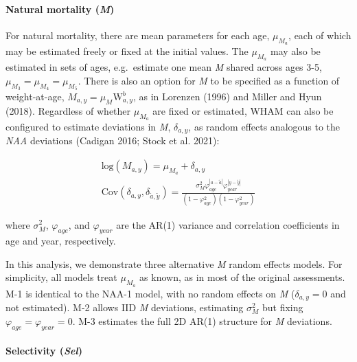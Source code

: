 \documentclass[]{article}
\let\oldparagraph\paragraph
\renewcommand{\paragraph}[1]{\oldparagraph{#1}\mbox{}}
\begin{document}
\hypertarget{natural-mortality-m}{%
\paragraph{\texorpdfstring{Natural mortality
(\emph{M})}{Natural mortality (M)}}\label{natural-mortality-m}}

For natural mortality, there are mean parameters for each age,
\(\mu_{M_a}\), each of which may be estimated freely or fixed at the
initial values. The \(\mu_{M_a}\) may also be estimated in sets of ages,
e.g.~estimate one mean \emph{M} shared across ages 3-5,
\(\mu_{M_3} = \mu_{M_4} = \mu_{M_5}\). There is also an option for
\emph{M} to be specified as a function of weight-at-age,
\(M_{a,y} = \mu_M \text{W}^b_{a,y}\), as in Lorenzen (1996) and Miller
and Hyun (2018). Regardless of whether \(\mu_{M_a}\) are fixed or
estimated, WHAM can also be configured to estimate deviations in
\emph{M}, \(\delta_{a,y}\), as random effects analogous to the
\emph{NAA} deviations (Cadigan 2016; Stock et al. 2021):

\begin{equation}
  \begin{array}{cc}
    \text{log}\left( M_{a,y} \right) = \mu_{M_a} + \delta_{a,y} \\
    \text{Cov} \left( \delta_{a,y}, \delta_{\tilde{a},\tilde{y}} \right) = \frac{\sigma^2_M \varphi^{|a-\tilde{a}|}_{age} \varphi^{|y-\tilde{y}|}_{year}}{\left(1-\varphi^2_{age}\right) \left(1-\varphi^2_{year}\right)}
  \end{array}
\end{equation}

where \(\sigma^2_M\), \(\varphi_{age}\), and \(\varphi_{year}\) are the
AR(1) variance and correlation coefficients in age and year,
respectively.

In this analysis, we demonstrate three alternative \emph{M} random
effects models. For simplicity, all models treat \(\mu_{M_a}\) as known,
as in most of the original assessments. M-1 is identical to the NAA-1
model, with no random effects on \emph{M} (\(\delta_{a,y} = 0\) and not
estimated). M-2 allows IID \emph{M} deviations, estimating
\(\sigma^2_M\) but fixing \(\varphi_{age} = \varphi_{year} = 0\). M-3
estimates the full 2D AR(1) structure for \emph{M} deviations.

\hypertarget{selectivity-sel}{%
\paragraph{\texorpdfstring{Selectivity
(\emph{Sel})}{Selectivity (Sel)}}\label{selectivity-sel}}
\end{document}
